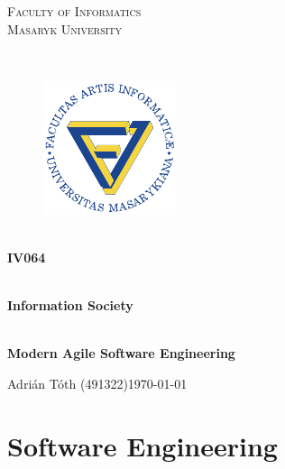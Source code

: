 \documentclass[12pt,a4paper]{article}
\theoremstyle{definition}
\begin{document}
\begin{titlepage}

    \begin{center}
        \vfill {%
            \Huge{%
                \textsc{%
                    Faculty of Informatics\\[3mm]%
                    Masaryk University%
                }%
            }%
        }%

        \hfill\\[15mm]

        \begin{figure}[!h]
            \centering
            \includegraphics[scale=3]{img/muni-fi-logo.pdf}
        \end{figure}

        \hfill\\[10mm]

        \Huge{
            \textbf{
                IV064
            }
        }

        \hfill\\[-10mm]

        \huge{
            \textbf{
                Information Society
            }
        }

        \hfill\\[10mm]

        \LARGE{
            \textbf{
                Modern Agile Software Engineering
            }
        }
        \vfill

    \end{center}

        \Large{
            \noindent Adrián Tóth (491322)\hfill \today
        }

\end{titlepage}

\setlength{\parskip}{0pt}
    {
        \hypersetup{
            hidelinks=true
        }
        \tableofcontents
    }
\setlength{\parskip}{0pt}

\newpage

\section{Software Engineering}
\end{document}
